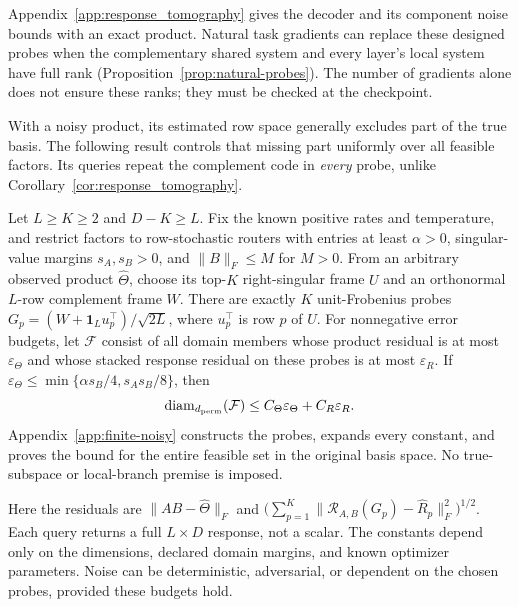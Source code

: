 Appendix~\ref{app:response_tomography} gives the decoder and its component
noise bounds with an exact product. Natural task gradients can replace
these designed probes when the complementary shared system and every
layer's local system have full rank
(Proposition~\ref{prop:natural-probes}). The number of gradients alone does not ensure these ranks; they must be
checked at the checkpoint.

With a noisy product, its estimated row space generally excludes part of
the true basis. The following result controls that missing part uniformly
over all feasible factors. Its queries repeat the complement code in
\emph{every} probe, unlike Corollary~\ref{cor:response_tomography}.

\begin{corollary}
\label{cor:finite-noisy-main}
Let $L\ge K\ge2$ and $D-K\ge L$. Fix the known positive rates and
temperature, and restrict factors to row-stochastic routers with entries
at least $\alpha>0$, singular-value margins $s_A,s_B>0$, and $\|B\|_F\le M$
for $M>0$.
From an arbitrary observed product $\widehat\Theta$, choose its top-$K$
right-singular frame $U$ and an orthonormal $L$-row complement frame $W$.
There are exactly $K$ unit-Frobenius probes
$G_p=(W+\mathbf1_Lu_p^\top)/\sqrt{2L}$, where $u_p^\top$ is row $p$ of $U$.
For nonnegative error budgets, let $\mathcal F$ consist of all domain members
whose product residual is at
most $\varepsilon_\Theta$ and whose stacked response residual on these
probes is at most $\varepsilon_R$. If
$\varepsilon_\Theta\le\min\{\alpha s_B/4,s_As_B/8\}$, then
\[
 \operatorname{diam}_{d_{\rm perm}}(\mathcal F)
 \le C_\Theta\varepsilon_\Theta+C_R\varepsilon_R.
\]
Appendix~\ref{app:finite-noisy} constructs the probes, expands every
constant, and proves the bound for the entire feasible set in the original
basis space. No true-subspace or local-branch premise is imposed.
\end{corollary}


Here the residuals are $\|AB-\widehat\Theta\|_F$ and
$\bigl(\sum_{p=1}^K\|\mathcal R_{A,B}(G_p)-\widehat R_p\|_F^2\bigr)^{1/2}$.
Each query returns a full $L\times D$ response, not a scalar. The constants
depend only on the dimensions, declared domain margins, and known optimizer
parameters. Noise can be deterministic, adversarial, or dependent on the
chosen probes, provided these budgets hold.

